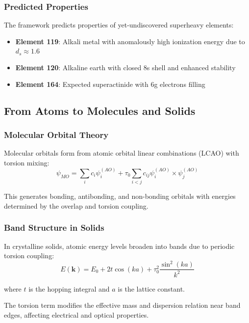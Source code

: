 \subsubsection{Predicted Properties}

The framework predicts properties of yet-undiscovered superheavy elements:
\begin{itemize}
    \item \textbf{Element 119}: Alkali metal with anomalously high ionization energy due to $d_s \approx 1.6$
    \item \textbf{Element 120}: Alkaline earth with closed 8s shell and enhanced stability
    \item \textbf{Element 164}: Expected superactinide with 6g electrons filling
\end{itemize}

\subsection{From Atoms to Molecules and Solids}

\subsubsection{Molecular Orbital Theory}

Molecular orbitals form from atomic orbital linear combinations (LCAO) with torsion mixing:
\begin{equation}
    \psi_{MO} = \sum_i c_i \psi_i^{(AO)} + \tau_0 \sum_{i<j} c_{ij} \psi_i^{(AO)} \times \psi_j^{(AO)}
\end{equation}

This generates bonding, antibonding, and non-bonding orbitals with energies determined by the overlap and torsion coupling.

\subsubsection{Band Structure in Solids}

In crystalline solids, atomic energy levels broaden into bands due to periodic torsion coupling:
\begin{equation}
    E(\mathbf{k}) = E_0 + 2t \cos(ka) + \tau_0^2 \frac{\sin^2(ka)}{k^2}
\end{equation}

where $t$ is the hopping integral and $a$ is the lattice constant.

The torsion term modifies the effective mass and dispersion relation near band edges, affecting electrical and optical properties.

